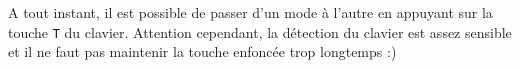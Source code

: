 \documentclass[a4paper,11pt]{article}
\begin{document}
A tout instant, il est possible de passer d'un mode à l'autre en appuyant sur la touche \texttt{T} du clavier. Attention cependant, la détection du clavier est assez sensible et il ne faut pas maintenir la touche enfoncée trop longtemps :)







\vfill
\begin{center}
\tengwarannataritalic[0.75]
\Textendedcalma\TTthreedots\Tnuumen\Tessenuquerna\TTthreedots\Tungwe\Tando\Toore\TTrightcurl\Tumbar\Ttinco\TTthreedots\Tlambealt\TTrightcurl\Tquesse\TTdoublerightcurl
\Tromanperiod\Ts
\Textendedcalma\TTthreedots\Tnuumen\Tessenuquerna\TTthreedots\Tungwe\Tungwe\Tumbar\TTnasalizer\TTdot\Ttinco\TTthreedots\Tlambe\TTrightcurl
{}\\
\Textendedcalma\TTthreedots\Tnuumen\Tessenuquerna\TTthreedots\Tungwe\Tthuule\Troomen\Tquesse\TTthreedots\Ttinco\TTthreedots\Tlambealt\TTrightcurl\Tquesse\TTdoublerightcurl
\Tromanperiod\Ts
\Textendedungwe\TTthreedots\Tumbar\Toore\TTrightcurl\Tesse{}\Tmalta\TTrightcurl\Textendedcalma\TTdot\Ttelco\TTdot\Tquesse\Troomen\Tparma\TTnasalizer\TTdot\Ttinco\TTthreedots\Tlambe\TTrightcurl
\end{center}
\end{document}
